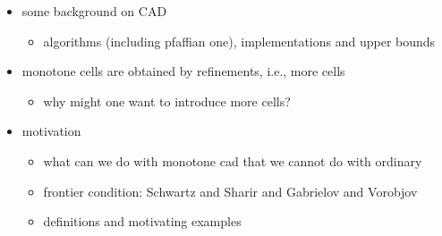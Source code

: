 \documentclass[
]{book}
\providecommand{\tightlist}{%
  \setlength{\itemsep}{0pt}\setlength{\parskip}{0pt}}
\theoremstyle{definition}
\theoremstyle{definition}
\theoremstyle{definition}
\theoremstyle{definition}
\theoremstyle{remark}
\begin{document}
\begin{itemize}
\tightlist
\item
  some background on CAD

  \begin{itemize}
  \tightlist
  \item
    algorithms (including pfaffian one), implementations and upper bounds
  \end{itemize}
\item
  monotone cells are obtained by refinements, i.e., more cells

  \begin{itemize}
  \tightlist
  \item
    why might one want to introduce more cells?
  \end{itemize}
\item
  motivation

  \begin{itemize}
  \tightlist
  \item
    what can we do with monotone cad that we cannot do with ordinary
  \item
    frontier condition: Schwartz and Sharir and Gabrielov and Vorobjov
  \item
    definitions and motivating examples


\end{itemize}
\end{itemize}
\end{document}
